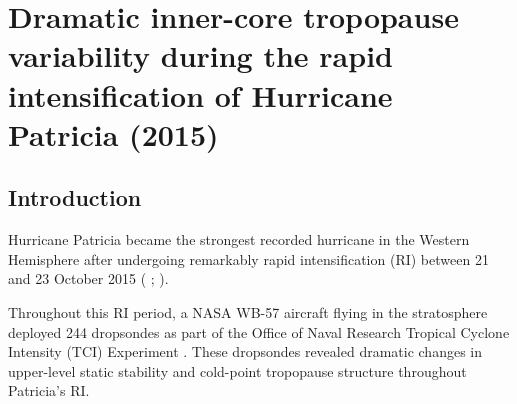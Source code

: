  
\chapter{Dramatic inner-core tropopause variability during the rapid intensification of {Hurricane Patricia} (2015)}
\label{chapter:patricia}
\resetfootnote %



\section{Introduction}

Hurricane Patricia became the strongest recorded hurricane in the Western Hemisphere after undergoing remarkably rapid intensification (RI) between 21 and 23 October 2015 (\citeauthor{Kimberlainetal2016} \citeyear{Kimberlainetal2016}; \citeauthor{Rogersetal2017} \citeyear{Rogersetal2017}).

Throughout this RI period, a NASA WB-57 aircraft flying in the stratosphere deployed 244 dropsondes as part of the Office of Naval Research Tropical Cyclone Intensity (TCI) Experiment \cite{DoyleTCI}.
These dropsondes revealed dramatic changes in upper-level static stability and cold-point tropopause structure throughout Patricia’s RI.

